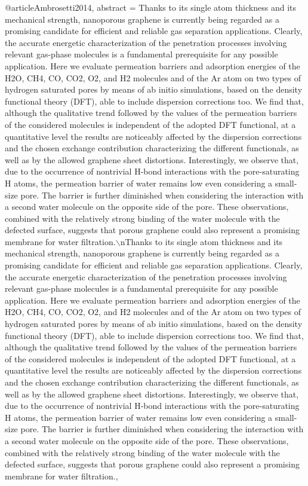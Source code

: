 @article{Ambrosetti2014,
abstract = {Thanks to its single atom thickness and its mechanical strength, nanoporous graphene is currently being regarded as a promising candidate for efficient and reliable gas separation applications. Clearly, the accurate energetic characterization of the penetration processes involving relevant gas-phase molecules is a fundamental prerequisite for any possible application. Here we evaluate permeation barriers and adsorption energies of the H2O, CH4, CO, CO2, O2, and H2 molecules and of the Ar atom on two types of hydrogen saturated pores by means of ab initio simulations, based on the density functional theory (DFT), able to include dispersion corrections too. We find that, although the qualitative trend followed by the values of the permeation barriers of the considered molecules is independent of the adopted DFT functional, at a quantitative level the results are noticeably affected by the dispersion corrections and the chosen exchange contribution characterizing the different functionals, as well as by the allowed graphene sheet distortions. Interestingly, we observe that, due to the occurrence of nontrivial H-bond interactions with the pore-saturating H atoms, the permeation barrier of water remains low even considering a small-size pore. The barrier is further diminished when considering the interaction with a second water molecule on the opposite side of the pore. These observations, combined with the relatively strong binding of the water molecule with the defected surface, suggests that porous graphene could also represent a promising membrane for water filtration.$\backslash$nThanks to its single atom thickness and its mechanical strength, nanoporous graphene is currently being regarded as a promising candidate for efficient and reliable gas separation applications. Clearly, the accurate energetic characterization of the penetration processes involving relevant gas-phase molecules is a fundamental prerequisite for any possible application. Here we evaluate permeation barriers and adsorption energies of the H2O, CH4, CO, CO2, O2, and H2 molecules and of the Ar atom on two types of hydrogen saturated pores by means of ab initio simulations, based on the density functional theory (DFT), able to include dispersion corrections too. We find that, although the qualitative trend followed by the values of the permeation barriers of the considered molecules is independent of the adopted DFT functional, at a quantitative level the results are noticeably affected by the dispersion corrections and the chosen exchange contribution characterizing the different functionals, as well as by the allowed graphene sheet distortions. Interestingly, we observe that, due to the occurrence of nontrivial H-bond interactions with the pore-saturating H atoms, the permeation barrier of water remains low even considering a small-size pore. The barrier is further diminished when considering the interaction with a second water molecule on the opposite side of the pore. These observations, combined with the relatively strong binding of the water molecule with the defected surface, suggests that porous graphene could also represent a promising membrane for water filtration.},
}
